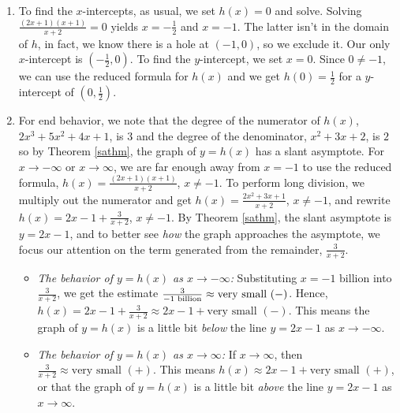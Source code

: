 \documentclass{ximera}
\begin{document}
\begin{example}
\begin{enumerate}
\begin{itemize}
\end{itemize}


\item  To find the $x$-intercepts, as usual, we set $h(x) = 0$ and solve.  Solving $\frac{(2x+1)(x+1)}{x+2}=0$ yields $x=-\frac{1}{2}$ and $x=-1$.  The latter isn't in the domain of $h$, in fact, we know there is a hole at $(-1,0)$,  so we exclude it.  Our only $x$-intercept is $\left(-\frac{1}{2}, 0\right)$.  To find the $y$-intercept, we set $x=0$.  Since $0 \neq -1$, we can use the reduced formula for $h(x)$ and we get $h(0) = \frac{1}{2}$ for a $y$-intercept of $\left(0,\frac{1}{2}\right)$.


\item  For end behavior, we note that the degree of the numerator of $h(x)$, $2x^3+5x^2+4x+1$, is $3$ and the degree of the denominator, $x^2+3x+2$, is $2$ so by Theorem \ref{sathm}, the graph of $y = h(x)$ has a slant asymptote.  For $x\rightarrow  -\infty$ or $x \rightarrow \infty$, we are far enough away from $x=-1$ to use the reduced formula, $h(x) = \frac{(2x+1)(x+1)}{x+2}$, $x \neq -1$.  To perform long division, we multiply out the numerator and get $h(x) = \frac{2x^2+3x+1}{x+2}$, $x \neq -1$, and rewrite $h(x) = 2x-1+\frac{3}{x+2}$, $x \neq -1$.  By Theorem \ref{sathm}, the slant asymptote is $y = 2x-1$, and to better see \textit{how} the graph approaches the asymptote, we focus our attention on the term generated from the remainder, $\frac{3}{x+2}$.

\begin{itemize}

\item  \textit{The behavior of $y=h(x)$ as $x \rightarrow -\infty$:} Substituting  $x = \text{$-1$ billion}$ into $\frac{3}{x+2}$, we get the estimate $\frac{3}{\text{\scriptsize $-1$ billion}} \approx \text{very small $(-)$}$.  Hence, $h(x) = 2x-1+\frac{3}{x+2} \approx 2x-1 + \text{very small $(-)$}$.  This means the graph of $y=h(x)$ is a little bit \textit{below} the line $y=2x-1$ as $x \rightarrow -\infty$.

\item  \textit{The behavior of $y=h(x)$ as $x \rightarrow \infty$:}  If $x \rightarrow \infty$, then $\frac{3}{x+2} \approx \text{very small $(+)$}$.  This means $h(x) \approx 2x-1 + \text{very small $(+)$}$, or that the graph of $y=h(x)$ is a little bit \textit{above} the line $y=2x-1$ as $x \rightarrow \infty$.

\end{itemize}


\end{enumerate}
\end{example}
\end{document}
